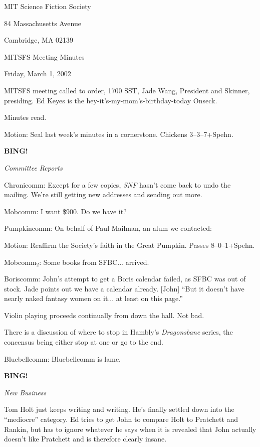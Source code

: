 \documentclass[12pt]{article}
\newcommand{\bing}{{\bf BING!} }
\newcommand{\goto}[1]{\bing \vskip 12pt \centerline{{\em{#1}}}}
\begin{document}
\begin{center}

MIT Science Fiction Society 

84 Massachusetts Avenue

Cambridge, MA 02139

\vspace{12pt}

MITSFS Meeting Minutes 

Friday, March 1, 2002

\end{center}
 
\vspace{18pt}

\setlength{\parskip}{6pt}

\noindent
MITSFS meeting called to order, 1700 SST, Jade Wang, President and
Skinner, presiding.  Ed Keyes is the hey-it's-my-mom's-birthday-today
Onseck.

Minutes read.

Motion: Seal last week's minutes in a cornerstone.  Chickens 3--3--7+Spehn.

\goto{Committee Reports}

Chronicomm: Except for a few copies, {\em SNF} hasn't come back to undo
the mailing.  We're still getting new addresses and sending out more.

Mobcomm: I want \$900.  Do we have it?

Pumpkincomm: On behalf of Paul Mailman, an alum we contacted:

Motion: Reaffirm the Society's faith in the Great Pumpkin.  Passes
8--0--1+Spehn.

Mobcomm$_2$: Some books from SFBC... arrived.

Boriscomm: John's attempt to get a Boris calendar failed, as SFBC
was out of stock.  Jade points out we have a calendar already.
[John] ``But it doesn't have nearly naked fantasy women on it... at
least on this page.''

Violin playing proceeds continually from down the hall.  Not bad.

There is a discussion of where to stop in Hambly's {\em Dragonsbane}
series, the concensus being either stop at one or go to the end.

Bluebellcomm: Bluebellcomm is lame.

\goto{New Business}

Tom Holt just keeps writing and writing.  He's finally settled down
into the ``mediocre'' category.  Ed tries to get John to compare Holt
to Pratchett and Rankin, but has to ignore whatever he says when it
is revealed that John actually doesn't like Pratchett and is therefore
clearly insane.
\end{document}

